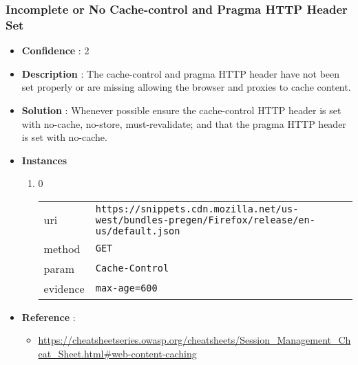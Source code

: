 \documentclass[10pt]{article}
\begin{document}
\subsubsection{Incomplete or No Cache-control and Pragma HTTP Header Set}
\begin{itemize}
\item[] \textbf{Confidence} : 2
\item[] \textbf{Description} : The cache-control and pragma HTTP header have not been set properly or are missing allowing the browser and proxies to cache content.
\item[] \textbf{Solution} :  Whenever possible ensure the cache-control HTTP header is set with no-cache, no-store, must-revalidate; and that the pragma HTTP header is set with no-cache.
\item[] \textbf{Instances}
\begin{enumerate}
\item[] 0
\begin{tabular}{| l | p{12cm}}
uri & \texttt{https://snippets.cdn.mozilla.net/us-west/bundles-pregen/Firefox/release/en-us/default.json} \\
method & \texttt{GET} \\
param & \texttt{Cache-Control} \\
evidence & \texttt{max-age=600} \\
\end{tabular}
\end{enumerate}
\item[] \textbf{Reference} : 
\begin{itemize}
\item \url{https://cheatsheetseries.owasp.org/cheatsheets/Session\_Management\_Cheat\_Sheet.html\#web-content-caching}
\end{itemize}
\end{itemize}
\end{document}
